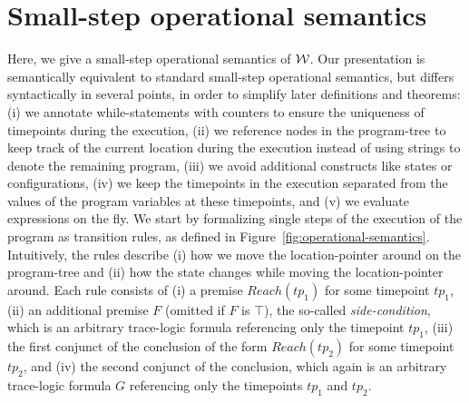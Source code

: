 
\section{Small-step operational semantics} \label{sec:sos-semantics}

Here, we give a small-step operational semantics of $\mathcal{W}$. 
%
Our presentation is semantically equivalent to standard small-step operational semantics, but differs syntactically in several points, in order to simplify later definitions and theorems:
(i) we annotate while-statements with counters to ensure the uniqueness of timepoints during the execution,
(ii) we reference nodes in the program-tree to keep track of the
current location during the execution instead of using strings to
denote the remaining program, 
(iii) we avoid additional constructs like states or configurations, 
(iv) we keep the timepoints in the execution separated from the values of the program variables at these timepoints, and
(v) we evaluate expressions on the fly.
%
We start by formalizing single steps of the execution of the program as transition rules, as defined in Figure~\ref{fig:operational-semantics}.
%
Intuitively, the rules describe 
(i) how we move the location-pointer around on the program-tree and 
(ii) how the state changes while moving the location-pointer around.
%
Each rule consists of 
(i) a premise $\mathit{Reach}(tp_1)$ for some timepoint $tp_1$, 
(ii) an additional premise $F$ (omitted if $F$ is $\top$), the so-called \emph{side-condition}, which is an arbitrary trace-logic formula referencing only the timepoint $tp_1$, 
(iii) the first conjunct of the conclusion of the form $\mathit{Reach}(tp_2)$ for some timepoint $tp_2$, and 
(iv) the second conjunct of the conclusion, which again is an arbitrary trace-logic formula $G$ referencing only the timepoints $tp_1$ and $tp_2$.

